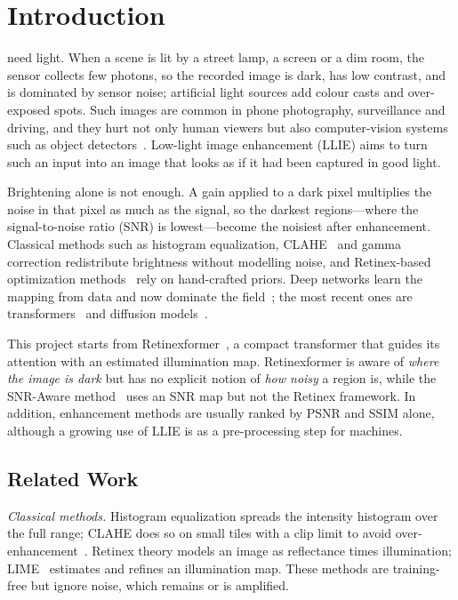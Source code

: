 \documentclass[journal]{IEEEtran}
\begin{document}
\section{Introduction}
 need light. When a scene is lit by a street lamp, a screen or a dim room, the sensor
collects few photons, so the recorded image is dark, has low contrast, and is dominated by sensor noise; artificial
light sources add colour casts and over-exposed spots. Such images are common in phone photography,
surveillance and driving, and they hurt not only human viewers but also computer-vision systems such as object
detectors~\cite{li2022survey,loh2019exdark}. Low-light image enhancement (LLIE) aims to turn such an input into an
image that looks as if it had been captured in good light.

Brightening alone is not enough. A gain applied to a dark pixel multiplies the noise in that pixel as much as the
signal, so the darkest regions---where the signal-to-noise ratio (SNR) is lowest---become the noisiest after
enhancement. Classical methods such as histogram equalization, CLAHE~\cite{zuiderveld1994clahe} and gamma
correction redistribute brightness without modelling noise, and Retinex-based optimization
methods~\cite{guo2017lime} rely on hand-crafted priors. Deep networks learn the mapping from data and now dominate
the field~\cite{li2022survey}; the most recent ones are transformers~\cite{xu2022snr,wang2023llformer,cai2023retinexformer}
and diffusion models~\cite{hou2023gsad,yi2023diffretinex}.

This project starts from Retinexformer~\cite{cai2023retinexformer}, a compact transformer that guides its attention
with an estimated illumination map. Retinexformer is aware of \emph{where the image is dark} but has no explicit
notion of \emph{how noisy} a region is, while the SNR-Aware method~\cite{xu2022snr} uses an SNR map but not the
Retinex framework. In addition, enhancement methods are usually ranked by PSNR and SSIM alone, although a growing use
of LLIE is as a pre-processing step for machines.

\subsection{Related Work}
\emph{Classical methods.} Histogram equalization spreads the intensity histogram over the full range; CLAHE does
so on small tiles with a clip limit to avoid over-enhancement~\cite{zuiderveld1994clahe}. Retinex theory models an
image as reflectance times illumination; LIME~\cite{guo2017lime} estimates and refines an illumination map. These
methods are training-free but ignore noise, which remains or is amplified.
\end{document}
